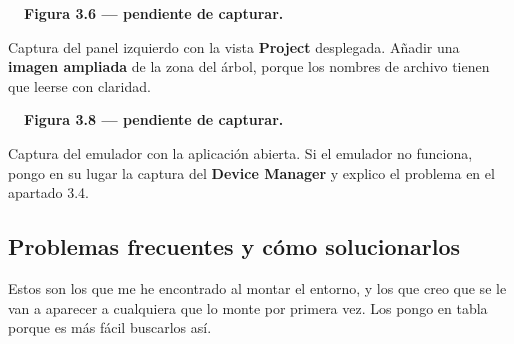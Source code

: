 \documentclass[11pt,a4paper]{article}
\newcommand{\figpend}[2]{%
	\begin{capturabox}
		\textbf{\color{accent2!70!black}\faCamera\ \ Figura #1 --- pendiente de capturar.}%
		\par\smallskip #2
	\end{capturabox}%
}
\begin{document}
	\figpend{3.6}{Captura del panel izquierdo con la vista \textbf{Project} desplegada. Añadir una \textbf{imagen ampliada} de la zona del árbol, porque los nombres de archivo tienen que leerse con claridad.}
	
	
	\figpend{3.8}{Captura del emulador con la aplicación abierta. Si el emulador no funciona, pongo en su lugar la captura del \textbf{Device Manager} y explico el problema en el apartado 3.4.}
	
	\subsection{Problemas frecuentes y cómo solucionarlos}
	
	Estos son los que me he encontrado al montar el entorno, y los que creo que se le van a aparecer a cualquiera que lo monte por primera vez. Los pongo en tabla porque es más fácil buscarlos así.
	
\end{document}

